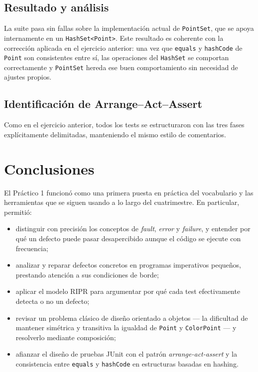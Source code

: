 \documentclass[12pt,a4paper]{article}
\begin{document}
\subsection{Resultado y análisis}
La suite pasa sin fallas sobre la implementación actual de \texttt{PointSet}, que se apoya internamente en un \texttt{HashSet<Point>}. Este resultado es coherente con la corrección aplicada en el ejercicio anterior: una vez que \texttt{equals} y \texttt{hashCode} de \texttt{Point} son consistentes entre sí, las operaciones del \texttt{HashSet} se comportan correctamente y \texttt{PointSet} hereda ese buen comportamiento sin necesidad de ajustes propios.

\subsection{Identificación de Arrange--Act--Assert}
Como en el ejercicio anterior, todos los tests se estructuraron con las tres fases explícitamente delimitadas, manteniendo el mismo estilo de comentarios.

\newpage
\section*{Conclusiones}
El Práctico 1 funcionó como una primera puesta en práctica del vocabulario y las herramientas que se siguen usando a lo largo del cuatrimestre. En particular, permitió:
\begin{itemize}
  \item distinguir con precisión los conceptos de \textit{fault}, \textit{error} y \textit{failure}, y entender por qué un defecto puede pasar desapercibido aunque el código se ejecute con frecuencia;
  \item analizar y reparar defectos concretos en programas imperativos pequeños, prestando atención a sus condiciones de borde;
  \item aplicar el modelo RIPR para argumentar por qué cada test efectivamente detecta o no un defecto;
  \item revisar un problema clásico de diseño orientado a objetos --- la dificultad de mantener simétrica y transitiva la igualdad de \texttt{Point} y \texttt{ColorPoint} --- y resolverlo mediante composición;
  \item afianzar el diseño de pruebas JUnit con el patrón \textit{arrange-act-assert} y la consistencia entre \texttt{equals} y \texttt{hashCode} en estructuras basadas en hashing.
\end{itemize}
\end{document}
